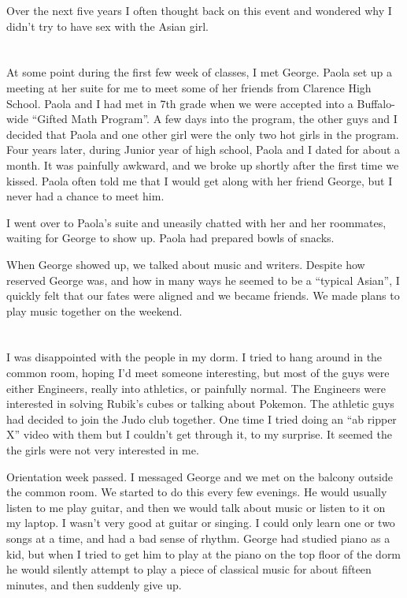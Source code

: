 Over the next five years I often thought back on this event and wondered why I
didn't try to have sex with the Asian girl.  

\section{}

At some point during the first few week of classes, I met George.  Paola set up
a meeting at her suite for me to meet some of her friends from Clarence High
School.  Paola and I had met in 7th grade when we were accepted into a
Buffalo-wide ``Gifted Math Program''.  A few days into the program, the other
guys and I decided that Paola and one other girl were the only two hot girls in
the program.  Four years later, during Junior year of high school, Paola and I
dated for about a month.  It was painfully awkward, and we broke up shortly
after the first time we kissed.  Paola often told me that I would get along with
her friend George, but I never had a chance to meet him. 

I went over to Paola's suite and uneasily chatted with her and her
roommates, waiting for George to show up.  Paola had prepared bowls of snacks.

When George showed up, we talked about music and writers.  Despite how reserved
George was, and how in many ways he seemed to be a ``typical Asian'', I quickly
felt that our fates were aligned and we became friends.  We made plans to play
music together on the weekend.

\section{}

I was disappointed with the people in my dorm.  I tried to hang around in the
common room, hoping I'd meet someone interesting, but most of the guys were
either Engineers, really into athletics, or painfully normal.  The Engineers
were interested in solving Rubik's cubes or talking about Pokemon.  The athletic
guys had decided to join the Judo club together.  One time I tried doing an ``ab
ripper X'' video with them but I couldn't get through it, to my surprise.  It
seemed the the girls were not very interested in me.

Orientation week passed.  I messaged George and we met on the balcony outside
the common room.  We started to do this every few evenings.  He would usually
listen to me play guitar, and then we would talk about music or listen to it on
my laptop.  I wasn't very good at guitar or singing.  I could only learn one or
two songs at a time, and had a bad sense of rhythm.  George had studied piano as
a kid, but when I tried to get him to play at the piano on the top floor of the
dorm he would silently attempt to play a piece of classical music for about
fifteen minutes, and then suddenly give up.  

